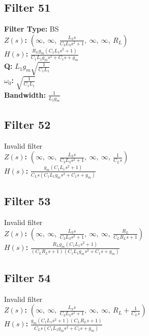 \documentclass{article}
\begin{document}
\subsection*{Filter 51}
\textbf{Filter Type:} BS \\ 
\textbf{$Z(s)$:} $\left( \infty, \  \infty, \  \frac{L_{3} s}{C_{3} L_{3} s^{2} + 1}, \  \infty, \  \infty, \  R_{L}\right)$ \\ 
\textbf{$H(s)$:} $\frac{R_{L} g_{m} \left(C_{1} L_{1} s^{2} + 1\right)}{C_{1} L_{1} g_{m} s^{2} + C_{1} s + g_{m}}$ \\ 
\textbf{Q:} $L_{1} g_{m} \sqrt{\frac{1}{C_{1} L_{1}}}$ \\ 
\textbf{$\omega_0$:} $\sqrt{\frac{1}{C_{1} L_{1}}}$ \\ 
\textbf{Bandwidth:} $\frac{1}{L_{1} g_{m}}$ \\ 
\subsection*{Filter 52}
Invalid filter \\ 
\textbf{$Z(s)$:} $\left( \infty, \  \infty, \  \frac{L_{3} s}{C_{3} L_{3} s^{2} + 1}, \  \infty, \  \infty, \  \frac{1}{C_{L} s}\right)$ \\ 
\textbf{$H(s)$:} $\frac{g_{m} \left(C_{1} L_{1} s^{2} + 1\right)}{C_{L} s \left(C_{1} L_{1} g_{m} s^{2} + C_{1} s + g_{m}\right)}$ \\ 
\subsection*{Filter 53}
Invalid filter \\ 
\textbf{$Z(s)$:} $\left( \infty, \  \infty, \  \frac{L_{3} s}{C_{3} L_{3} s^{2} + 1}, \  \infty, \  \infty, \  \frac{R_{L}}{C_{L} R_{L} s + 1}\right)$ \\ 
\textbf{$H(s)$:} $\frac{R_{L} g_{m} \left(C_{1} L_{1} s^{2} + 1\right)}{\left(C_{L} R_{L} s + 1\right) \left(C_{1} L_{1} g_{m} s^{2} + C_{1} s + g_{m}\right)}$ \\ 
\subsection*{Filter 54}
Invalid filter \\ 
\textbf{$Z(s)$:} $\left( \infty, \  \infty, \  \frac{L_{3} s}{C_{3} L_{3} s^{2} + 1}, \  \infty, \  \infty, \  R_{L} + \frac{1}{C_{L} s}\right)$ \\ 
\textbf{$H(s)$:} $\frac{g_{m} \left(C_{1} L_{1} s^{2} + 1\right) \left(C_{L} R_{L} s + 1\right)}{C_{L} s \left(C_{1} L_{1} g_{m} s^{2} + C_{1} s + g_{m}\right)}$ \\ 
\end{document}
